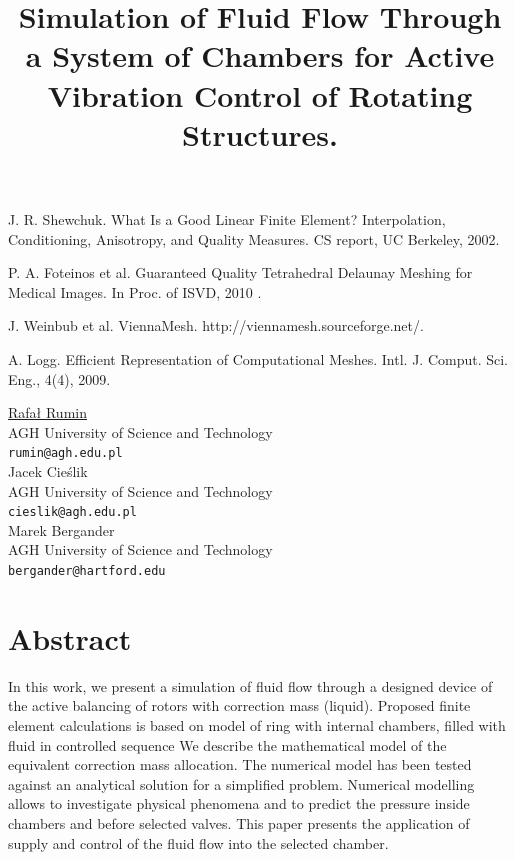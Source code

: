 \documentclass[article, A4, 11pt]{llncs}%
\begin{document}

\begin{thebibliography}{10}
{\sc J. R. Shewchuk}. {What Is a Good Linear Finite Element? Interpolation, Conditioning, Anisotropy, and Quality Measures}. CS report, UC Berkeley, 2002.

{\sc P. A. Foteinos et al}. {Guaranteed Quality Tetrahedral Delaunay Meshing for Medical Images}. In Proc. of ISVD, 2010 .

{\sc J. Weinbub et al}. {ViennaMesh}. http://viennamesh.sourceforge.net/.

{\sc A. Logg}. {Efficient Representation of Computational Meshes}. Intl. J. Comput. Sci. Eng., 4(4), 2009.
\end{thebibliography} %

\title{Simulation of Fluid Flow Through a System of Chambers for Active Vibration Control of Rotating Structures.}
 \author{} \institute{}
\maketitle
\begin{center}
{\large \underline{Rafał Rumin}}\\
AGH University of Science and Technology\\
{\tt rumin@agh.edu.pl}
\\ \vspace{4mm}
{\large Jacek Cieślik}\\
AGH University of Science and Technology\\
{\tt cieslik@agh.edu.pl}
\\ \vspace{4mm}
{\large Marek Bergander}\\
AGH University of Science and Technology\\
{\tt bergander@hartford.edu}
\end{center}

\section*{Abstract}
In this work, we present a simulation of fluid flow through a designed device of the active balancing of rotors with correction mass (liquid). Proposed finite element calculations is based on model of ring with internal chambers, filled with fluid in controlled sequence We describe the mathematical model of the equivalent correction mass allocation.
The numerical model has been tested against an analytical solution for a simplified problem. Numerical modelling allows to investigate physical phenomena and to predict the pressure inside chambers and before selected valves. This paper presents the application of  supply and control of the fluid flow into the selected chamber. 
\end{document}
